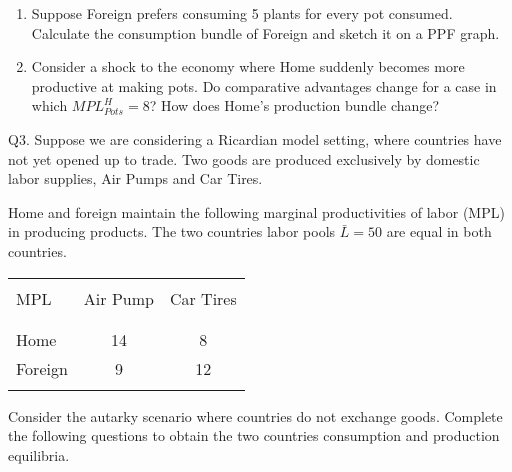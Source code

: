 \documentclass[12pt]{article}
\begin{document}
\begin{enumerate}[1)]
\bigskip

\bigskip

\bigskip

\bigskip  


\newpage

\item Suppose Foreign prefers consuming 5 plants for every pot consumed. Calculate the consumption bundle of Foreign and sketch it on a PPF graph. 

\vspace{2in}

\item Consider a shock to the economy where Home suddenly becomes more productive at making pots. Do comparative advantages change for a case in which $MPL^H_{Pots}=8$?
How does Home's production bundle change?

\vspace{4in}

\end{enumerate}

\newpage


\noindent Q3. Suppose we are considering a Ricardian model setting, where countries have not yet opened up to trade.
Two goods are produced exclusively by domestic labor supplies, Air Pumps and Car Tires. 

\noindent Home and foreign maintain the following marginal productivities of labor (MPL) in producing products. The two countries labor pools $\bar{L}=50$ are equal in both countries. 

\begin{table}[!h]
	\centering
	\begin{tabular}[t]{l c c }
		\hline
		&&\\
		MPL & Air Pump & Car Tires  \\
		&&\\
		\hline
		&&\\
		Home & 14 & 8  \\
		Foreign & 9 & 12 \\
		&&\\
		\hline
	\end{tabular}
\end{table}



Consider the autarky scenario where countries do not exchange goods. Complete the following questions to obtain the two countries consumption and production equilibria. 
\end{document}
